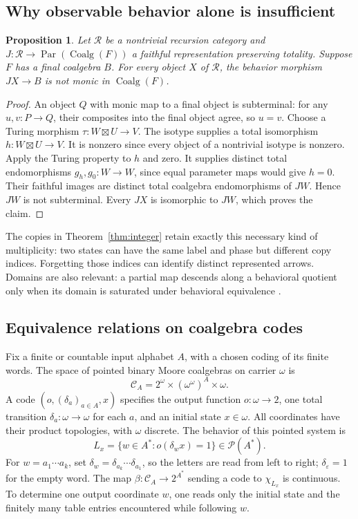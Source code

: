 \documentclass[11pt]{article}
\newtheorem{proposition}[theorem]{Proposition}
\theoremstyle{definition}
\newcommand{\R}{\mathcal R}
\newcommand{\Par}{\operatorname{Par}}
\newcommand{\Coalg}{\operatorname{Coalg}}
\begin{document}
\subsection{Why observable behavior alone is insufficient}
\begin{proposition}\label{prop:multiplicity}
Let $\R$ be a nontrivial recursion category and
$J:\R\to\Par(\Coalg(F))$ a faithful representation preserving
totality. Suppose $F$ has a final coalgebra $B$. For every object $X$
of $\R$, the behavior morphism $JX\to B$ is not monic in
$\Coalg(F)$.
\end{proposition}
\begin{proof}
An object $Q$ with monic map to a final object is subterminal: for
any $u,v:P\to Q$, their composites into the final object agree,
so $u=v$. Choose a Turing morphism $\tau:W\boxtimes U\to V$.
The isotype supplies a total isomorphism
$h:W\boxtimes U\to V$. It is nonzero since every object of a
nontrivial isotype is nonzero. Apply the Turing property to $h$ and zero.
It supplies distinct total endomorphisms $g_h,g_0:W\to W$, since
equal parameter maps would give $h=0$. Their faithful images are
distinct total coalgebra endomorphisms of $JW$. Hence $JW$ is not
subterminal. Every $JX$ is isomorphic to $JW$, which proves the claim.
\end{proof}

The copies in Theorem~\ref{thm:integer} retain exactly this necessary
kind of multiplicity: two states can have the same label and phase
but different copy indices. Forgetting those indices can identify
distinct represented arrows. Domains are also relevant: a partial
map descends along a behavioral quotient only when its domain is
saturated under behavioral equivalence \cite[Proposition 3.3]{Comparisons}.

\subsection{Equivalence relations on coalgebra codes}\label{sec:moore-codes}
Fix a finite or countable input alphabet $A$, with a chosen coding
of its finite words. The space of pointed binary Moore coalgebras
on carrier $\omega$ is
\[
 \mathcal C_A=2^\omega\times(\omega^\omega)^A\times\omega.
\]
A code $(o,(\delta_a)_{a\in A},x)$ specifies the output function
$o:\omega\to2$, one total transition
$\delta_a:\omega\to\omega$ for each $a$, and an initial state
$x\in\omega$. All coordinates have their product topologies, with
$\omega$ discrete. The behavior of this pointed system is
\[
 L_x=\{w\in A^*:o(\delta_wx)=1\}\in\mathcal P(A^*).
\]
For $w=a_1\cdots a_k$, set
$\delta_w=\delta_{a_k}\cdots\delta_{a_1}$, so the letters are
read from left to right; $\delta_\varepsilon=1$ for the empty word.
The map $\beta:\mathcal C_A\to2^{A^*}$ sending a code to
$\chi_{L_x}$ is continuous. To determine one output coordinate
$w$, one reads only the initial state and the finitely many table
entries encountered while following $w$.
\end{document}

